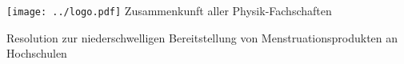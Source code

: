 \documentclass[DIV=calc]{scrartcl}
\begin{document}
\hspace{0.87\textwidth}
\begin{minipage}{120pt}
	\vspace{-1.8cm}
	\texttt{[image: ../logo.pdf]}
	\centering
	\small Zusammenkunft aller Physik-Fachschaften
\end{minipage}

\begin{center}
  \huge{Resolution zur niederschwelligen Bereitstellung von Menstruationsprodukten an Hochschulen}\vspace{.25\baselineskip}\\
  \normalsize
\end{center}
\vspace{1cm}

%
%
%




\end{document}
